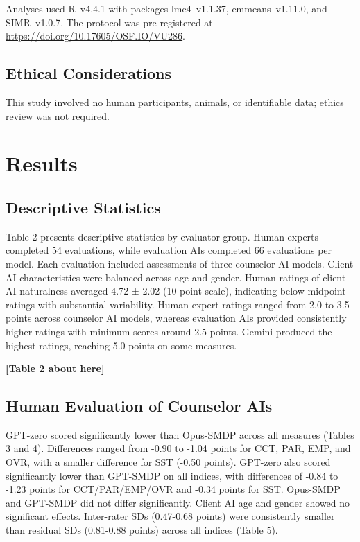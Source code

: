 \documentclass{wiley-article}
\begin{document}
Analyses used \textsf{R}~v4.4.1 with packages \textsf{lme4}~v1.1.37, \textsf{emmeans}~v1.11.0, and \textsf{SIMR}~v1.0.7. The protocol was pre-registered at \url{https://doi.org/10.17605/OSF.IO/VU286}.

\subsection*{Ethical Considerations}
This study involved no human participants, animals, or identifiable data; ethics review was not required.




\section*{Results}

\subsection*{Descriptive Statistics}

Table 2 presents descriptive statistics by evaluator group. Human experts completed 54 evaluations, while evaluation AIs completed 66 evaluations per model. Each evaluation included assessments of three counselor AI models. Client AI characteristics were balanced across age and gender. Human ratings of client AI naturalness averaged 4.72 ± 2.02 (10-point scale), indicating below-midpoint ratings with substantial variability. Human expert ratings ranged from 2.0 to 3.5 points across counselor AI models, whereas evaluation AIs provided consistently higher ratings with minimum scores around 2.5 points. Gemini produced the highest ratings, reaching 5.0 points on some measures.

\begin{center}
\textbf{[Table 2 about here]}
\end{center}

\subsection*{Human Evaluation of Counselor AIs}

GPT-zero scored significantly lower than Opus-SMDP across all measures (Tables 3 and 4). Differences ranged from -0.90 to -1.04 points for CCT, PAR, EMP, and OVR, with a smaller difference for SST (-0.50 points). GPT-zero also scored significantly lower than GPT-SMDP on all indices, with differences of -0.84 to -1.23 points for CCT/PAR/EMP/OVR and -0.34 points for SST. Opus-SMDP and GPT-SMDP did not differ significantly. Client AI age and gender showed no significant effects. Inter-rater SDs (0.47-0.68 points) were consistently smaller than residual SDs (0.81-0.88 points) across all indices (Table 5).
\end{document}

